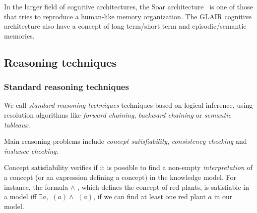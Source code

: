 In the larger field of cognitive architectures, the {\sc Soar}
architecture~\cite{Lehman2006} is one of those that tries to reproduce a
human-like memory organization. The GLAIR cognitive architecture also have a
concept of long term/short term and episodic/semantic memories.

\subsection{Reasoning techniques}
\label{sect|reasoning}

\begin{scriptsize}
\begin{center}
\end{center}
\end{scriptsize}


\subsubsection{Standard reasoning techniques}
\label{sect|std-reasoning}

We call \emph{standard reasoning techniques} techniques based on logical
inference, using resolution algorithms like \emph{forward chaining},
\emph{backward chaining} or \emph{semantic tableaux}.

Main reasoning problems include \emph{concept satisfiability},
\emph{consistency checking} and \emph{instance checking}.

Concept satisfiability verifies if it is possible to find a non-empty
\emph{interpretation} of a concept (or an expression defining a concept) in the
knowledge model. For instance, the formula  $\land$
, which defines the concept of red plants, is satisfiable in a
model  iff $\exists a, $ $(a) \land$
$(a)$, \ie if we can find at least one red plant $a$ in our
model.

